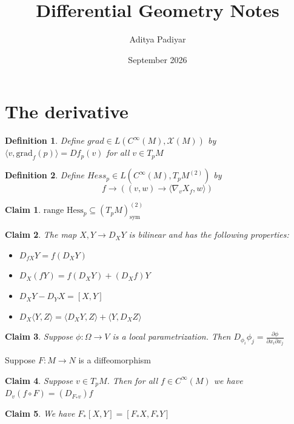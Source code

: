 \documentclass{article}
\title{Differential Geometry Notes}
\author{Aditya Padiyar}
\date{September 2026}
\newtheorem{definition}{Definition}
\newtheorem{claim}{Claim}
\begin{document}
\maketitle

\section{The derivative}

\begin{definition}
    Define $grad \in L(C^\infty(M),\mathcal{X}(M))$ by $\langle v,\text{grad}_f(p) \rangle = Df_p(v)$ for all $v \in T_pM$
\end{definition}

\begin{definition}
    Define $Hess_p \in L(C^\infty(M),T_pM^{(2)})$ by \[f \to ((v,w) \to \langle \nabla_vX_f,w\rangle)\]
\end{definition}

\begin{claim}
    $\text{range }\text{Hess}_p \subseteq (T_pM)^{(2)}_{\text{sym}}$
\end{claim}

\begin{claim}
    The map $X,Y \to D_XY$ is bilinear and has the following properties:
    \begin{itemize}
        \item $D_{fX}Y=f(D_XY)$
        \item $D_X(fY)=f(D_XY) + (D_Xf)Y$
        \item $D_XY-D_YX=[X,Y]$
        \item $D_X\langle Y, Z \rangle = \langle D_XY,Z \rangle + \langle Y, D_XZ \rangle$
    \end{itemize}
\end{claim}

\begin{claim}
    Suppose $\phi: \Omega \to V$ is a local parametrization. Then $D_{\phi_i}\phi_j=\frac{\partial \phi}{\partial x_i \partial x_j}$
\end{claim}

Suppose $F:M \to N$ is a diffeomorphism

\begin{claim}
     Suppose $v \in T_pM$. Then for all $f \in C^\infty(M)$ we have $D_v(f \circ F)=(D_{F_*v})f$
\end{claim}

\begin{claim}
    We have $F_*[X,Y]=[F_*X,F_*Y]$
\end{claim}
\end{document}
